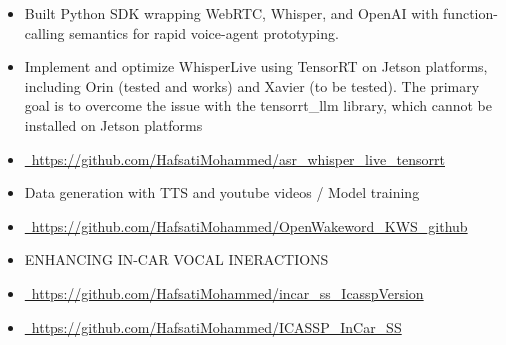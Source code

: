 \documentclass[9pt,a4paper,ragged2e]{altacv}
\begin{document}
\newpage
\begin{paracol}{2}
\begin{itemize}
  \item Built Python SDK wrapping WebRTC, Whisper, and OpenAI with function-calling semantics for rapid voice-agent prototyping.
\end{itemize}

\vspace{6pt}
\begin{itemize}
  \item Implement and optimize WhisperLive using TensorRT on Jetson platforms, including Orin (tested and works) and Xavier (to be tested). The primary goal is to overcome the issue with the tensorrt\_llm library, which cannot be installed on Jetson platforms
  \item \href{https://github.com/HafsatiMohammed/asr_whisper_live_tensorrt}{\faExternalLink\ https://github.com/HafsatiMohammed/asr\_whisper\_live\_tensorrt}
\end{itemize}

\vspace{6pt}
\begin{itemize}
  \item Data generation with TTS and youtube videos / Model training 
  \item \href{https://github.com/HafsatiMohammed/OpenWakeword_KWS_github}{\faExternalLink\ https://github.com/HafsatiMohammed/OpenWakeword\_KWS\_github}
\end{itemize}

\vspace{4pt}
\begin{itemize}
  \item ENHANCING IN-CAR VOCAL INERACTIONS
  \item \href{https://github.com/HafsatiMohammed/incar_ss_IcasspVersion}{\faExternalLink\ https://github.com/HafsatiMohammed/incar\_ss\_IcasspVersion}
  \item \href{https://github.com/HafsatiMohammed/ICASSP_InCar_SS}{\faExternalLink\ https://github.com/HafsatiMohammed/ICASSP\_InCar\_SS}
\end{itemize}


\end{paracol}
\end{document}
